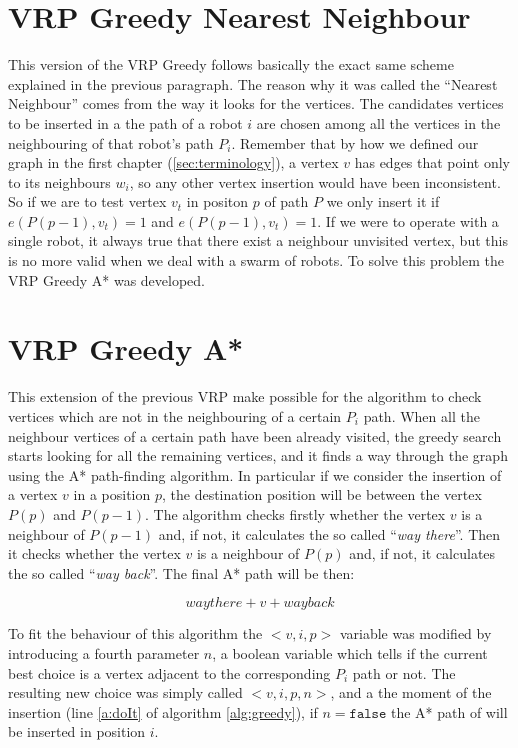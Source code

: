 


\section{VRP Greedy Nearest Neighbour}

This version of the VRP Greedy follows basically the exact same scheme explained in the previous paragraph. The reason why it was called the ``Nearest Neighbour'' comes from the way it looks for the vertices. The candidates vertices to be inserted in a the path of a robot $i$ are chosen among all the vertices in the neighbouring of that robot's path $P_i$. Remember that by how we defined our graph in the first chapter (\ref{sec:terminology}), a vertex $v$ has edges that point only to its neighbours $w_i$, so any other vertex insertion would have been inconsistent. So if we are to test vertex $v_t$ in positon $p$ of path $P$ we only insert it if $e(P(p-1),v_t)=1$ and $e(P(p-1),v_t)=1$.
If we were to operate with a single robot, it always true that there exist a neighbour unvisited vertex, but this is no more valid when we deal with a swarm of robots. To solve this problem the VRP Greedy A* was developed.

\section{VRP Greedy A*}

This extension of the previous VRP make possible for the algorithm to check vertices which are not in the neighbouring of a certain $P_i$ path. When all the neighbour vertices of a certain path have been already visited, the greedy search starts looking for all the remaining vertices, and it finds a way through the graph using the A* path-finding algorithm. In particular if we consider the insertion of a vertex $v$ in a position $p$, the destination position will be between the vertex $P(p)$ and $P(p-1)$. The algorithm checks firstly whether the vertex $v$ is a neighbour of $P(p-1)$ and, if not, it calculates the so called ``\emph{way there}''. Then it checks whether the vertex $v$ is a neighbour of $P(p)$ and, if not, it calculates the so called ``\emph{way back}''. The final A* path will be then:

\begin{equation}
way there + v + way back \label{e:astarpath}
\end{equation}

To fit the behaviour of this algorithm the \mbox{$<v,i,p>$} variable was modified by introducing a fourth parameter $n$, a boolean variable which tells if the current best choice is a vertex adjacent to the corresponding $P_i$ path or not. The resulting new choice was simply called \mbox{$<v,i,p,n>$}, and a the moment of the insertion (line \ref{a:doIt} of algorithm \ref{alg:greedy}), if $n=\texttt{false}$ the A* path of will be inserted in position $i$.

